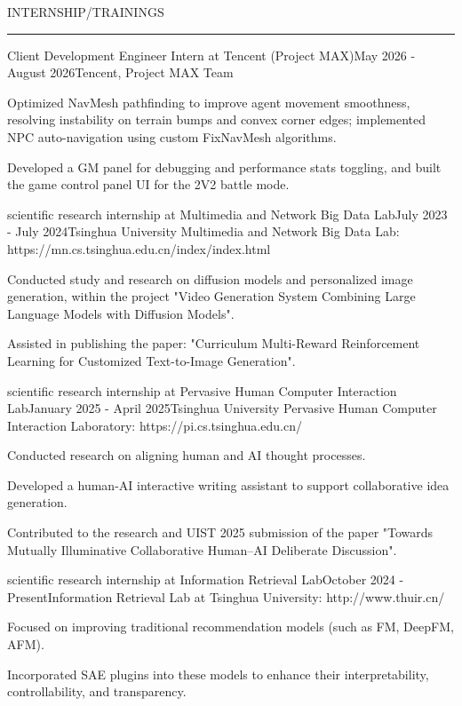 \documentclass{resume_rhodes} %
\def\sectionskip{\smallskip}
\def\sectionlineskip{\smallskip}
\renewenvironment{rSection}[1]{
\sectionskip
\textcolor{TsinghuaPurple}{\MakeUppercase{#1}}
\sectionlineskip
\hrule
\begin{list}{}{
\setlength{\leftmargin}{0em}
}
\item[]
}{
\end{list}
}
\begin{document}
\begin{rSection}{INTERNSHIP/TRAININGS}

\begin{rSubsection}{Client Development Engineer Intern at Tencent (Project MAX)}{May 2026 - August 2026}{Tencent, Project MAX Team}{}              
\item Optimized NavMesh pathfinding to improve agent movement smoothness, resolving instability on terrain bumps and convex corner edges; implemented NPC auto-navigation using custom FixNavMesh algorithms.
\item Developed a GM panel for debugging and performance stats toggling, and built the game control panel UI for the 2V2 battle mode.
\end{rSubsection}  

\begin{rSubsection}{scientific research internship at Multimedia and Network Big Data Lab}{July 2023 - July 2024}{Tsinghua University Multimedia and Network Big Data Lab: https://mn.cs.tsinghua.edu.cn/index/index.html}{}              
\item Conducted study and research on diffusion models and personalized image generation, within the project "Video Generation System Combining Large Language Models with Diffusion Models".
\item Assisted in publishing the paper: "Curriculum Multi-Reward Reinforcement Learning for Customized Text-to-Image Generation".
\end{rSubsection}  

\begin{rSubsection}{scientific research internship at Pervasive Human Computer Interaction Lab}{January 2025 - April 2025}{Tsinghua University Pervasive Human Computer Interaction Laboratory: https://pi.cs.tsinghua.edu.cn/}{}              
\item Conducted research on aligning human and AI thought processes.
\item Developed a human-AI interactive writing assistant to support collaborative idea generation.
\item Contributed to the research and UIST 2025 submission of the paper "Towards Mutually Illuminative Collaborative Human–AI Deliberate Discussion".
\end{rSubsection}  

\begin{rSubsection}{scientific research internship at Information Retrieval Lab}{October 2024 - Present}{Information Retrieval Lab at Tsinghua University: http://www.thuir.cn/}{}              
\item Focused on improving traditional recommendation models (such as FM, DeepFM, AFM).
\item Incorporated SAE plugins into these models to enhance their interpretability, controllability, and transparency.
\end{rSubsection}  

\end{rSection}
\end{document}
